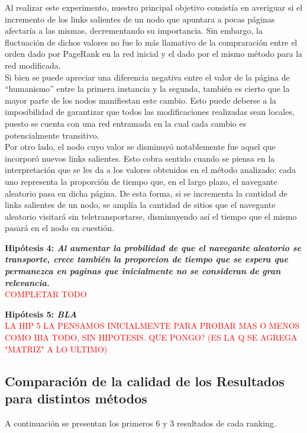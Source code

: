 \documentclass[a4paper]{article}
\begin{document}
\indent Al realizar este experimento, nuestro principal objetivo consistía en averiguar si el incremento de los links salientes de un nodo que apuntara a pocas páginas afectaría a las mismas, decrementando su importancia. Sin embargo, la fluctuación de dichos valores no fue lo más llamativo de la compraración entre el orden dado por PageRank en la red inicial y el dado por el mismo método para la red modificada. \\
\indent Si bien se puede apreciar una diferencia negativa entre el valor de la página de ``humanismo'' entre la primera instancia y la segunda, también es cierto que la mayor parte de los nodos manifiestan este cambio. Esto puede deberse a la imposibilidad de garantizar que todos las modificaciones realizadas sean locales, puesto se cuenta con una red entramada en la cual cada cambio es potencialmente transitivo. \\
\indent Por otro lado, el nodo cuyo valor se disminuyó notablemente fue aquel que incorporó nuevos links salientes. Esto cobra sentido cuando se piensa en la interpretación que se les da a los valores obtenidos en el método analizado: cada uno representa la proporción de tiempo que, en el largo plazo, el navegante aleatorio pasa en dicha página. De esta forma, si se incrementa la cantidad de links salientes de un nodo, se amplía la cantidad de sitios que el navegante aleatorio visitará sin teletransportarse, disminuyendo así el tiempo que el mismo pasará en el nodo en cuestión.


\newpage


\textbf{Hipótesis 4: \itshape{Al aumentar la probilidad de que el navegante aleatorio se transporte, crece también la proporcion de tiempo que se espera que permanezca en paginas que inicialmente no se consideran de gran relevancia.
 }}\\
\textcolor{red}{COMPLETAR TODO}\\

\newpage

\textbf{Hipótesis 5: \itshape{BLA }}\\
\textcolor{red}{LA HIP 5 LA PENSAMOS INICIALMENTE PARA PROBAR MAS O MENOS COMO IBA TODO, SIN HIPOTESIS. QUE PONGO? (ES LA Q SE AGREGA "MATRIZ" A LO ULTIMO)}\\

\newpage
\subsection{Comparaci\'on de la calidad de los Resultados para distintos m\'etodos}
A continuaci\'on se presentan los primeros 6 y 3 resultados de cada ranking.
\end{document}
